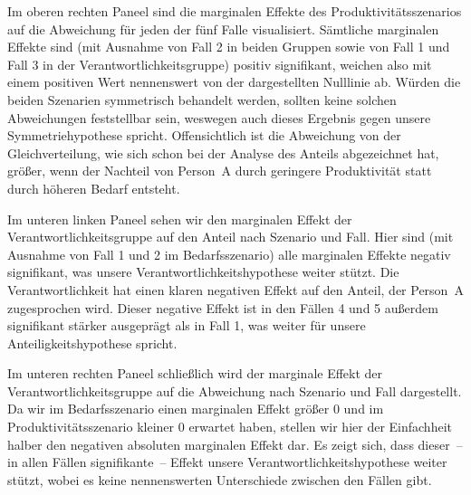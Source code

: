 \documentclass[justified,nobib,nohyper,symmetric,twoside]{tufte-book}
\begin{document}
Im oberen rechten Paneel sind die marginalen Effekte des Produktivitätsszenarios auf die Abweichung für jeden der fünf Falle visualisiert.
Sämtliche marginalen Effekte sind (mit Ausnahme von Fall 2 in beiden Gruppen sowie von Fall 1 und Fall 3 in der Verantwortlichkeitsgruppe) positiv signifikant, weichen also mit einem positiven Wert nennenswert von der dargestellten Nulllinie ab.
Würden die beiden Szenarien symmetrisch behandelt werden, sollten keine solchen Abweichungen feststellbar sein, weswegen auch dieses Ergebnis gegen unsere Symmetriehypothese spricht.
Offensichtlich ist die Abweichung von der Gleichverteilung, wie sich schon bei der Analyse des Anteils abgezeichnet hat, größer, wenn der Nachteil von Person~A durch geringere Produktivität statt durch höheren Bedarf entsteht.

Im unteren linken Paneel sehen wir den marginalen Effekt der Verantwortlichkeitsgruppe auf den Anteil nach Szenario und Fall.
Hier sind (mit Ausnahme von Fall 1 und 2 im Bedarfsszenario) alle marginalen Effekte negativ signifikant, was unsere Verantwortlichkeitshypothese weiter stützt.
Die Verantwortlichkeit hat einen klaren negativen Effekt auf den Anteil, der Person~A zugesprochen wird.
Dieser negative Effekt ist in den Fällen 4 und 5 außerdem signifikant stärker ausgeprägt als in Fall 1, was weiter für unsere Anteiligkeitshypothese spricht.

Im unteren rechten Paneel schließlich wird der marginale Effekt der Verantwortlichkeitsgruppe auf die Abweichung nach Szenario und Fall dargestellt.
Da wir im Bedarfsszenario einen marginalen Effekt größer 0 und im Produktivitätsszenario kleiner 0 erwartet haben, stellen wir hier der Einfachheit halber den negativen absoluten marginalen Effekt dar.
Es zeigt sich, dass dieser~-- in allen Fällen signifikante~-- Effekt unsere Verantwortlichkeitshypothese weiter stützt, wobei es keine nennenswerten Unterschiede zwischen den Fällen gibt.
\end{document}
